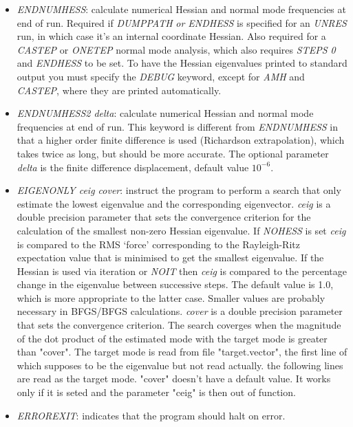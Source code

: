 \documentclass[12pt,a4paper,dvips]{article}
\begin{document}
\begin{itemize}
\item {\it ENDNUMHESS\/}: calculate numerical Hessian and normal mode
frequencies at end of run.
Required if {\it DUMPPATH\/} {\it or ENDHESS\/} is specified for an {\it UNRES\/} run,
in which case it's an internal coordinate Hessian.
Also required for a {\it CASTEP\/} or {\it ONETEP} normal mode analysis, which
also requires {\it STEPS 0\/} and {\it ENDHESS\/} to be set.
To have the Hessian eigenvalues printed to standard output you must specify the 
{\it DEBUG\/} keyword, except for {\it AMH\/} and {\it CASTEP\/}, where they are printed
automatically. 

\item {\it ENDNUMHESS2 delta\/}: calculate numerical Hessian and normal mode
frequencies at end of run. This keyword is different from {\it ENDNUMHESS} in
that a higher order finite difference is used (Richardson extrapolation), which 
takes twice as long, but should be more accurate. The optional parameter {\it delta}
is the finite difference displacement, default value $10^{-6}$.

\item {\it EIGENONLY ceig cover\/}: instruct the program to perform a search that only estimate the lowest eigenvalue and the corresponding eigenvector. 
{\it ceig\/} is a double precision parameter that sets the convergence criterion for
the calculation of the smallest non-zero Hessian eigenvalue.
If {\it NOHESS\/} is set {\it ceig\/} is compared to the RMS `force' corresponding to the
Rayleigh-Ritz expectation value that is minimised to get the smallest eigenvalue.
If the Hessian is used via iteration or {\it NOIT\/}
then {\it ceig\/} is compared to the percentage change in the eigenvalue between successive
steps. The default value is 1.0, which is more appropriate to the latter case. Smaller
values are probably necessary in BFGS/BFGS calculations.
{\it cover\/} is a double precision parameter that sets the convergence criterion. The search coverges when the magnitude of the dot product of the estimated mode with the target mode is greater than "cover". 
The target mode is read from file "target.vector", the first line of which supposes to be the eigenvalue but not read actually. the following lines are read as the target mode.
"cover" doesn't have a default value. It works only if it is seted and the parameter "ceig" is then out of function.

\item {\it ERROREXIT\/}: indicates that the program should halt on error.


\end{itemize}
\end{document}
